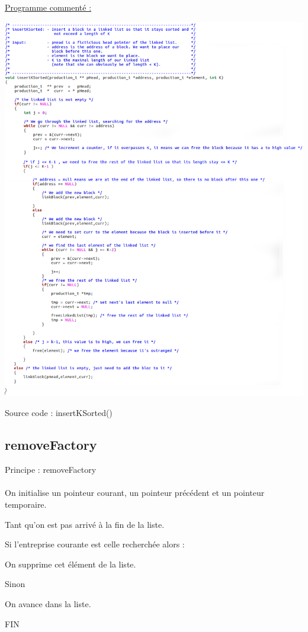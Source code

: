 \documentclass[a4paper]{article}
\newcommand\tab[1][1cm]{\hspace*{#1}}
\begin{document}
\underline{Programme commenté :}
\begin{center}
\includegraphics[scale=0.39]{insertKSorted.png}

Source code : insertKSorted()
\end{center}
\subsection{removeFactory}
\begin{algorithm}
Principe : removeFactory
\\
\\
\tab On initialise un pointeur courant, un pointeur précédent et un pointeur temporaire. 

\tab Tant qu'on est pas arrivé à la fin de la liste.

\tab \tab Si l'entreprise courante est celle recherchée alors : 

\tab \tab \tab On supprime cet élément de la liste.

\tab \tab Sinon

\tab \tab \tab On avance dans la liste.

FIN
\end{algorithm}
\end{document}
